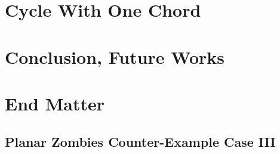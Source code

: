 \documentclass[letterpaper, 12pt]{report}
\theoremstyle{definition}
\begin{document}
\chapter{Cycle With One Chord \label{chapter q_m_n}}


\chapter{Conclusion, Future Works}


\newpage



\appendix


%

%

%

%

%

\chapter{End Matter}
%

\section{Planar Zombies Counter-Example Case III}
%

\end{document}
